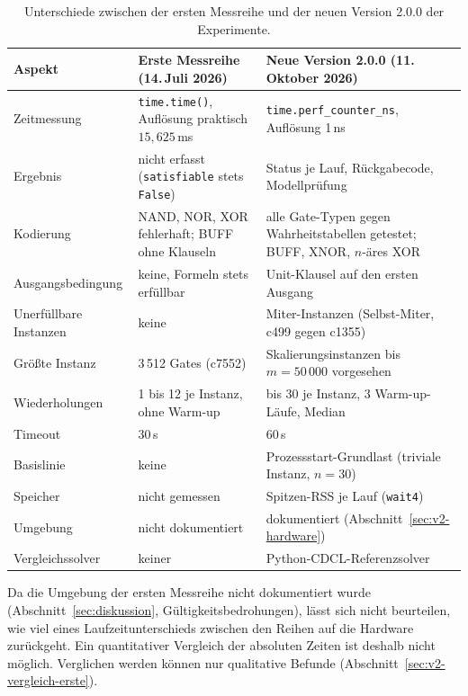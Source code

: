 \documentclass[a4paper,12pt]{article}
\theoremstyle{definition}
\begin{document}
\begin{table}[ht]
\centering\small
\renewcommand{\arraystretch}{1.15}
\begin{tabular}{p{3.6cm}p{5.4cm}p{5.6cm}}
\toprule
Aspekt & Erste Messreihe (14.\,Juli 2026) & Neue Version 2.0.0 (11.\,Oktober 2026) \\
\midrule
Zeitmessung & \texttt{time.time()}, Auflösung praktisch $15{,}625$\,ms & \texttt{time.perf\_counter\_ns}, Auflösung 1\,ns \\
Ergebnis & nicht erfasst (\texttt{satisfiable} stets \texttt{False}) & Status je Lauf, Rückgabecode, Modellprüfung \\
Kodierung & NAND, NOR, XOR fehlerhaft; BUFF ohne Klauseln & alle Gate-Typen gegen Wahrheitstabellen getestet; BUFF, XNOR, $n$-äres XOR \\
Ausgangsbedingung & keine, Formeln stets erfüllbar & Unit-Klausel auf den ersten Ausgang \\
Unerfüllbare Instanzen & keine & Miter-Instanzen (Selbst-Miter, c499 gegen c1355) \\
Größte Instanz & 3\,512 Gates (c7552) & Skalierungsinstanzen bis $m=50\,000$ vorgesehen \\
Wiederholungen & 1 bis 12 je Instanz, ohne Warm-up & bis 30 je Instanz, 3 Warm-up-Läufe, Median \\
Timeout & 30\,s & 60\,s \\
Basislinie & keine & Prozessstart-Grundlast (triviale Instanz, $n=30$) \\
Speicher & nicht gemessen & Spitzen-RSS je Lauf (\texttt{wait4}) \\
Umgebung & nicht dokumentiert & dokumentiert (Abschnitt~\ref{sec:v2-hardware}) \\
Vergleichssolver & keiner & Python-CDCL-Referenzsolver \\
\bottomrule
\end{tabular}
\caption{Unterschiede zwischen der ersten Messreihe und der neuen Version 2.0.0 der Experimente.}
\label{tab:v2-aenderungen}
\end{table}

Da die Umgebung der ersten Messreihe nicht dokumentiert wurde (Abschnitt~\ref{sec:diskussion}, Gültigkeitsbedrohungen), lässt sich nicht beurteilen, wie viel eines Laufzeitunterschieds zwischen den Reihen auf die Hardware zurückgeht. Ein quantitativer Vergleich der absoluten Zeiten ist deshalb nicht möglich. Verglichen werden können nur qualitative Befunde (Abschnitt~\ref{sec:v2-vergleich-erste}).

\end{document}
